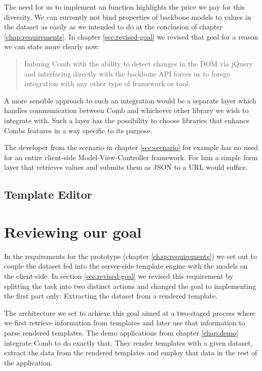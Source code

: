 \documentclass[thesis.tex]{subfiles}
\begin{document}
The need for us to implement an  function highlights the
price we pay for this diversity. We can currently not bind properties of
backbone models to values in the dataset as easily as we intended to do at the
conclusion of chapter \ref{chap:requirements}. In chapter \ref{sec:revised-goal}
we revised that goal for a reason we can state more clearly now:
\begin{quote}
Imbuing Comb with the ability to detect changes in the DOM via jQuery and
interfacing directly with the backbone API forces us to forego integration with
any other type of framework or tool.
\end{quote}
A more sensible approach to such an integration would be a separate layer which
handles communication between Comb and whichever other library we wish to
integrate with. Such a layer has the possibility to choose libraries that
enhance Combs features in a way specific to its purpose.

The developer from the scenario in chapter \ref{sec:scenario} for example has
no need for an entire client-side Model-View-Controller framework.
For him a simple form layer that retrieves values and submits them as JSON to a
URL would suffice.


\subsection{Template Editor}


\section{Reviewing our goal}
In the requirements for the prototype (chapter \ref{chap:requirements})
we set out to couple the dataset fed into the server-side template engine with
the models on the client-side. In section \ref{sec:revised-goal} we revised this
requirement by splitting the task into two distinct actions and changed the goal
to implementing the first part only: Extracting the dataset from a rendered
template.

The architecture we set to achieve this goal aimed at a two-staged process where
we first retrieve information from templates and later use that information to
parse rendered templates. The demo applications from chapter \ref{chap:demo}
integrate Comb to do exactly that. They render templates with a given dataset,
extract the data from the rendered templates and employ that data in the rest of
the application.
\end{document}
